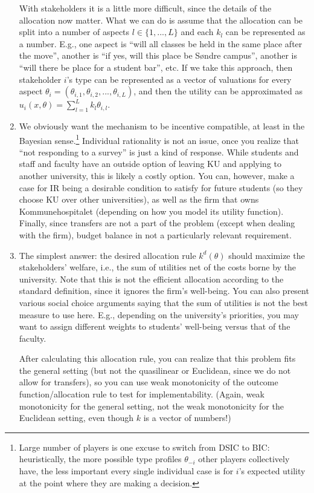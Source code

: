 \documentclass[a4paper]{article}
\begin{document}
\begin{enumerate}
	With stakeholders it is a little more difficult, since the details of the allocation now matter. What we can do is assume that the allocation can be split into a number of aspects $l \in \{1,...,L\}$ and each $k_l$ can be represented as a number. E.g., one aspect is ``will all classes be held in the same place after the move'', another is ``if yes, will this place be S{\o}ndre campus'', another is ``will there be place for a student bar'', etc. If we take this approach, then stakeholder $i$'s type can be represented as a vector of valuations for every aspect $\theta_i = (\theta_{i,1}, \theta_{i,2}, ..., \theta_{i,L})$, and then the utility can be approximated as $u_i(x,\theta) = \sum_{l=1}^L k_l \theta_{i,l}$.
	
	\item We obviously want the mechanism to be incentive compatible, at least in the Bayesian sense.\footnote{Large number of players is one excuse to switch from DSIC to BIC: heuristically, the more possible type profiles $\theta_{-i}$ other players collectively have, the less important every single individual case is for $i$'s expected utility at the point where they are making a decision.}
	Individual rationality is not an issue, once you realize that ``not responding to a survey'' is just a kind of response. While students and staff and faculty have an outside option of leaving KU and applying to another university, this is likely a costly option. You can, however, make a case for IR being a desirable condition to satisfy for future students (so they choose KU over other universities), as well as the firm that owns Kommunehospitalet (depending on how you model its utility function).
	Finally, since transfers are not a part of the problem (except when dealing with the firm), budget balance in not a particularly relevant requirement.
	
	\item The simplest answer: the desired allocation rule $k^d(\theta)$ should maximize the stakeholders' welfare, i.e., the sum of utilities net of the costs borne by the university. Note that this is not the efficient allocation according to the standard definition, since it ignores the firm's well-being. You can also present various social choice arguments saying that the sum of utilities is not the best measure to use here. E.g., depending on the university's priorities, you may want to assign different weights to students' well-being versus that of the faculty.
	
	After calculating this allocation rule, you can realize that this problem fits the general setting (but not the quasilinear or Euclidean, since we do not allow for transfers), so you can use weak monotonicity of the outcome function/allocation rule to test for implementability. (Again, weak monotonicity for the general setting, not the weak monotonicity for the Euclidean setting, even though $k$ is a vector of numbers!)
	

\end{enumerate}
\end{document}
